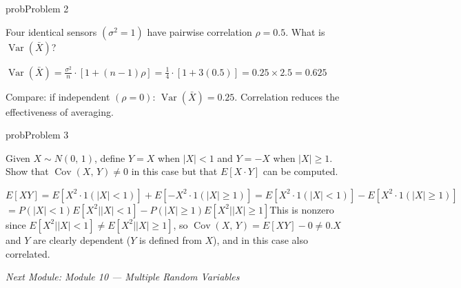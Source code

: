\begin{PSbox}[unbreakable]{prob}{Problem 2}

Four identical sensors $(\sigma^{2} = 1)$ have pairwise correlation $\rho = 0.5$. What is $\operatorname{Var}(\bar{X})$?

\PSsolution{} $\displaystyle \operatorname{Var}(\bar{X}) = \frac{\sigma^{2}}{n} \cdot [1 + (n-1)\rho] = \frac{1}{4} \cdot [1 + 3(0.5)] = 0.25 \times 2.5 = 0.625$

Compare: if independent $(\rho = 0)$: $\operatorname{Var}(\bar{X}) = 0.25$. Correlation reduces the effectiveness of averaging.

\end{PSbox}

\begin{PSbox}[unbreakable]{prob}{Problem 3}

Given $X \sim N(0,\,1)$, define $Y = X$ when $\lvert X\rvert < 1$ and $Y = -X$ when $\lvert X\rvert \ge 1$. Show that $\operatorname{Cov}(X,\,Y) \ne 0$ in this case but that $E[X \cdot Y]$ can be computed.

\PSsolution{} $E[XY] = E[X^{2} \cdot 1(\lvert X\rvert < 1)] + E[-X^{2} \cdot 1(\lvert X\rvert \ge 1)] = E[X^{2} \cdot 1(\lvert X\rvert < 1)] - E[X^{2} \cdot 1(\lvert X\rvert \ge 1)]$\PSbr{}$= P(\lvert X\rvert < 1)E[X^{2}\lvert \rvert X \mid < 1] - P(\lvert X\rvert \ge 1)E[X^{2}\lvert \rvert X \mid \ge 1]$\PSbr{}This is nonzero since $E[X^{2}\lvert \rvert X \mid < 1] \ne E[X^{2}\lvert \rvert X \mid \ge 1]$, so $\operatorname{Cov}(X,\,Y) = E[XY] - 0 \ne 0$.\PSbr{}$X$ and $Y$ are clearly dependent ($Y$ is defined from $X$), and in this case also correlated.

\emph{Next Module: {Module 10 — Multiple Random Variables}}

\end{PSbox}
